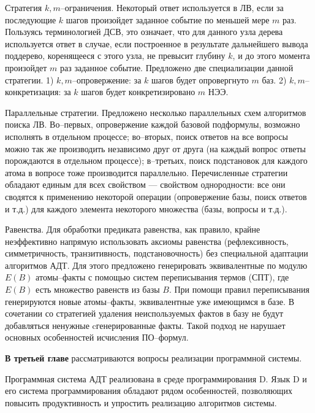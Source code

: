\documentclass[a4paper]{report}
\begin{document}
Стратегия $k,m$--ограничения. Некоторый ответ используется в ЛВ, если за последующие $k$ шагов произойдет заданное событие по меньшей мере $m$ раз. Пользуясь терминологией ДСВ, это означает, что для данного узла дерева используется ответ в случае, если построенное в результате дальнейшего вывода поддерево, коренящееся с этого узла, не превысит глубину $k$, и до этого момента произойдет $m$ раз заданное событие. Предложено две специализации данной стратегии. 1) $k,m$--опровержение: за $k$ шагов будет опровергнуто $m$ баз. 2) $k,m$--конкретизация: за $k$ шагов будет конкретизировано $m$ НЭЭ.

Параллельные стратегии. Предложено несколько параллельных схем алгоритмов поиска ЛВ. Во--первых, опровержение каждой базовой подформулы, возможно исполнять в отдельном процессе; во--вторых, поиск ответов на все вопросы можно так же производить независимо друг от друга (на каждый вопрос ответы порождаются в отдельном процессе); в--третьих, поиск подстановок для каждого атома в вопросе тоже производится параллельно. Перечисленные стратегии обладают единым для всех свойством --- свойством однородности: все они сводятся к применению некоторой операции (опровержение базы, поиск ответов и т.д.) для каждого элемента некоторого множества (базы, вопросы и т.д.).

Равенства. Для обработки предиката равенства, как правило, крайне неэффективно напрямую использовать аксиомы равенства (рефлексивность, симметричность, транзитивность, подстановочность) без специальной адаптации алгоритмов АДТ. Для этого предложено генерировать эквивалентные по модулю $E(B)$ атомы--факты с помощью систем переписывания термов (СПТ), где $E(B)$ есть множество равенств из базы $B$. При помощи правил переписывания генерируются новые атомы--факты, эквивалентные уже имеющимся в базе. В сочетании со стратегией удаления неиспользуемых фактов в базу не будут добавляться ненужные cгенерированные факты. Такой подход не нарушает основных особенностей исчисления ПО--формул.

\textbf{В третьей главе} рассматриваются вопросы реализации программной системы.

Программная система АДТ реализована в среде программирования D. Язык D и его система программирования обладают рядом особенностей, позволяющих повысить продуктивность и упростить реализацию алгоритмов системы.
\end{document}
